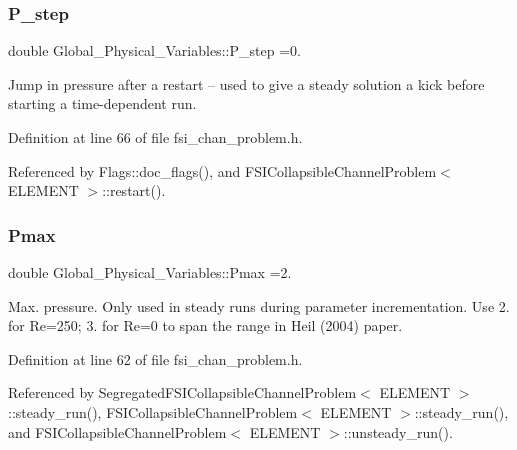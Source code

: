 \subsubsection{\texorpdfstring{P\+\_\+step}{P\_step}}
{\footnotesize\ttfamily double Global\+\_\+\+Physical\+\_\+\+Variables\+::\+P\+\_\+step =0.}



Jump in pressure after a restart -- used to give a steady solution a kick before starting a time-\/dependent run. 



Definition at line 66 of file fsi\+\_\+chan\+\_\+problem.\+h.



Referenced by Flags\+::doc\+\_\+flags(), and F\+S\+I\+Collapsible\+Channel\+Problem$<$ E\+L\+E\+M\+E\+N\+T $>$\+::restart().

\mbox{\label{namespaceGlobal__Physical__Variables_a3e094a3c45284edb77a880f49c93f94b}} 
\subsubsection{\texorpdfstring{Pmax}{Pmax}}
{\footnotesize\ttfamily double Global\+\_\+\+Physical\+\_\+\+Variables\+::\+Pmax =2.}



Max. pressure. Only used in steady runs during parameter incrementation. Use 2. for Re=250; 3. for Re=0 to span the range in Heil (2004) paper. 



Definition at line 62 of file fsi\+\_\+chan\+\_\+problem.\+h.



Referenced by Segregated\+F\+S\+I\+Collapsible\+Channel\+Problem$<$ E\+L\+E\+M\+E\+N\+T $>$\+::steady\+\_\+run(), F\+S\+I\+Collapsible\+Channel\+Problem$<$ E\+L\+E\+M\+E\+N\+T $>$\+::steady\+\_\+run(), and F\+S\+I\+Collapsible\+Channel\+Problem$<$ E\+L\+E\+M\+E\+N\+T $>$\+::unsteady\+\_\+run().

\mbox{\label{namespaceGlobal__Physical__Variables_ae6b6b04387b165c0da5160865170c0e7}} 
